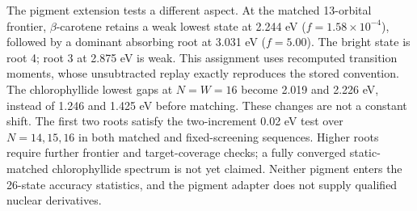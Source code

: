 The pigment extension tests a different aspect. At the matched
13-orbital frontier, $\beta$-carotene retains a weak lowest state at
2.244 eV ($f=1.58\times10^{-4}$), followed by a dominant absorbing
root at 3.031 eV ($f=5.00$). The bright state is root 4; root 3 at
2.875 eV is weak. This assignment uses recomputed transition moments,
whose unsubtracted replay exactly reproduces the stored convention.
The chlorophyllide lowest gaps at $N=W=16$ become 2.019 and 2.226 eV,
instead of 1.246 and 1.425 eV before matching. These changes are not
a constant shift. The first two roots satisfy the two-increment 0.02 eV
test over $N=14,15,16$ in both matched and fixed-screening sequences.
Higher roots require further frontier and target-coverage checks; a fully
converged static-matched chlorophyllide spectrum is not yet claimed.
Neither pigment enters the 26-state accuracy statistics, and the pigment
adapter does not supply qualified nuclear derivatives.
